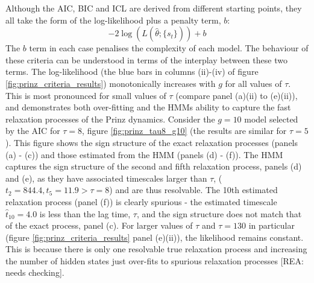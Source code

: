 Although the AIC, BIC and ICL are derived from different starting points, they all take the form of the log-likelihood plus a penalty term, $b$:
\begin{equation}
    -2\log{\left(L\left(\hat{\theta}; \{s_t\}\right)\right)} + b
\end{equation}
The $b$ term in each case penalises the complexity of each model. The behaviour of these criteria can be understood in terms of the interplay between these two terms. The log-likelihood (the blue bars in columns (ii)-(iv) of figure \ref{fig:prinz_criteria_results}) monotonically increases with $g$ for all values of $\tau$. This is most pronounced for small values of $\tau$ (compare panel (a)(ii) to (e)(ii)), and demonstrates both over-fitting and the HMMs ability to capture the fast relaxation processes of the Prinz dynamics. Consider the $g=10$ model selected by the AIC for $\tau=8$, figure \ref{fig:prinz_tau8_g10} (the results are similar for $\tau=5$). This figure shows the sign structure of the exact relaxation processes (panels (a) - (c)) and those estimated from the HMM (panels (d) - (f)). The HMM captures the sign structure of the second and fifth relaxation process,  panels (d) and (e), as they have associated timescales larger than $\tau$, ($t_{2}=844.4, t_{5} = 11.9 > \tau=8$) and are thus resolvable. The 10th estimated relaxation process (panel (f)) is clearly spurious - the estimated timescale $\hat{t}_{10} = 4.0$ is less than the lag time, $\tau$, and the sign structure does not match that of the exact process, panel (c). For larger values of $\tau$ and $\tau= 130$ in particular (figure \ref{fig:prinz_criteria_results} panel (e)(ii)), the likelihood remains constant. This is because there is only one resolvable true relaxation process and increasing the number of hidden states just over-fits to spurious relaxation processes [REA: needs checking].  

